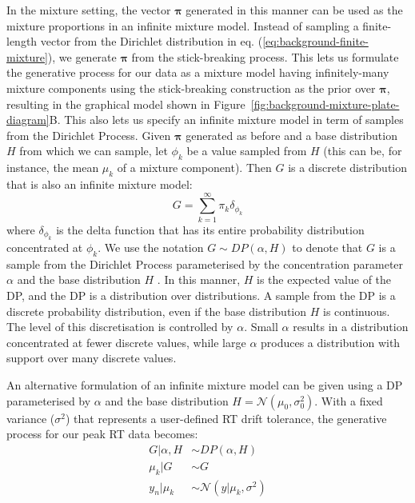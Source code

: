 In the mixture setting, the vector $\boldsymbol{\pi}$ generated in this manner can be used as the mixture proportions in an infinite mixture model. Instead of sampling a finite-length vector from the Dirichlet distribution in eq. (\ref{eq:background-finite-mixture}), we generate $\boldsymbol{\pi}$ from the stick-breaking process. This lets us formulate the generative process for our data as a mixture model having infinitely-many mixture components using the stick-breaking construction as the prior over $\boldsymbol{\pi}$, resulting in the graphical model shown in Figure~\ref{fig:background-mixture-plate-diagram}B. This also lets us specify an infinite mixture model in term of samples from the Dirichlet Process. Given $\boldsymbol{\pi}$ generated as before and a base distribution $H$ from which we can sample, let $\phi_k$ be a value sampled from $H$ (this can be, for instance, the mean $\mu_k$ of a mixture component). Then $G$ is a discrete distribution that is also an infinite mixture model:
\begin{equation}
G=\sum_{k=1}^{\infty} \pi_k \delta_{\phi_k}
\end{equation}
where $\delta_{\phi_k}$ is the delta function that has its entire probability distribution concentrated at $\phi_k$. We use the notation $G \sim DP(\alpha, H)$ to denote that $G$ is a sample from the Dirichlet Process parameterised by the concentration parameter $\alpha$ and the base distribution $H$ \cite{teh2011dirichlet}. In this manner, $H$ is the expected value of the DP, and the DP is a distribution over distributions. A sample from the DP is a discrete probability distribution, even if the base distribution $H$ is continuous. The level of this discretisation is controlled by $\alpha$. Small $\alpha$ results in a distribution concentrated at fewer discrete values, while large $\alpha$ produces a distribution with support over many discrete values.

An alternative formulation of an infinite mixture model can be given using a DP parameterised by $\alpha$ and the base distribution $H=\mathcal{N}(\mu_0, \sigma_0^2)$. With a fixed variance ($\sigma^2$) that represents a user-defined RT drift tolerance, the generative process for our peak RT data becomes:
\begin{equation}
\begin{aligned}
G \vert \alpha, H  &\sim DP(\alpha, H) \\
\mu_k \vert G     &\sim G \\
y_n \vert \mu_k  &\sim \mathcal{N}(y \vert \mu_k, \sigma^2)
\end{aligned}
\label{eq:background-infinite-mixture-dp}
\end{equation}

